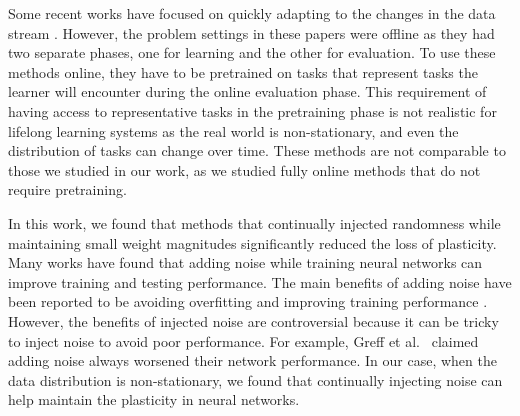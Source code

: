 \documentclass[review, number,3p]{elsarticle}
\begin{document}
Some recent works have focused on quickly adapting to the changes in the data stream \cite{finn2017, wang2017, nagabandi2019}. 
However, the problem settings in these papers were offline as they had two separate phases, one for learning and the other for evaluation. 
To use these methods online, they have to be pretrained on tasks that represent tasks the learner will encounter during the online evaluation phase. 
This requirement of having access to representative tasks in the pretraining phase is not realistic for lifelong learning systems as the real world is non-stationary, and even the distribution of tasks can change over time.
These methods are not comparable to those we studied in our work, as we studied fully online methods that do not require pretraining.

In this work, we found that methods that continually injected randomness while maintaining small weight magnitudes significantly reduced the loss of plasticity. 
Many works have found that adding noise while training neural networks can improve training and testing performance. The main benefits of adding noise have been reported to be avoiding overfitting and improving training performance \cite{holmstrom1992, gravesetal2013, neelakantan2015}. 
However, the benefits of injected noise are controversial because it can be tricky to inject noise to avoid poor performance. For example, Greff et al.\ \cite{greffetal2017} claimed adding noise always worsened their network performance. 
In our case, when the data distribution is non-stationary, we found that continually injecting noise can help maintain the plasticity in neural networks. 
\end{document}
